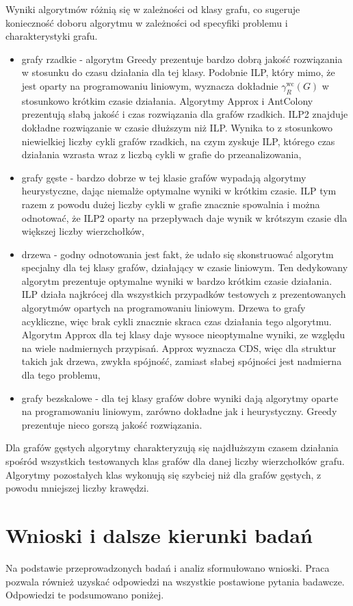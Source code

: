 Wyniki algorytmów różnią się w zależności od klasy grafu, co sugeruje konieczność doboru algorytmu w zależności od specyfiki problemu i charakterystyki grafu.
\begin{itemize}
    \item grafy rzadkie - algorytm Greedy prezentuje bardzo dobrą jakość rozwiązania w stosunku do czasu działania dla tej klasy. Podobnie ILP, który mimo, że jest oparty na programowaniu liniowym, wyznacza dokładnie $\gamma^{\text{wc}}_R(G)$ w stosunkowo krótkim czasie działania. Algorytmy Approx i AntColony prezentują słabą jakość i czas rozwiązania dla grafów rzadkich. ILP2 znajduje dokładne rozwiązanie w czasie dłuższym niż ILP. Wynika to z stosunkowo niewielkiej liczby cykli grafów rzadkich, na czym zyskuje ILP, którego czas działania wzrasta wraz z liczbą cykli w grafie do przeanalizowania,
    \item grafy gęste - bardzo dobrze w tej klasie grafów wypadają algorytmy heurystyczne, dając niemalże optymalne wyniki w krótkim czasie. ILP tym razem z powodu dużej liczby cykli w grafie znacznie spowalnia i można odnotować, że ILP2 oparty na przepływach daje wynik w krótszym czasie dla większej liczby wierzchołków,
    \item drzewa - godny odnotowania jest fakt, że udało się skonstruować algorytm specjalny dla tej klasy grafów, działający w czasie liniowym. Ten dedykowany algorytm prezentuje optymalne wyniki w bardzo krótkim czasie działania. ILP działa najkrócej dla wszystkich przypadków testowych z prezentowanych algorytmów opartych na programowaniu liniowym. Drzewa to grafy acykliczne, więc brak cykli znacznie skraca czas działania tego algorytmu. Algorytm Approx dla tej klasy daje wysoce nieoptymalne wyniki, ze względu na wiele nadmiernych przypisań. Approx wyznacza CDS, więc dla struktur takich jak drzewa, zwykła spójność, zamiast słabej spójności jest nadmierna dla tego problemu,
    \item grafy bezskalowe - dla tej klasy grafów dobre wyniki dają algorytmy oparte na programowaniu liniowym, zarówno dokładne jak i heurystyczny. Greedy prezentuje nieco gorszą jakość rozwiązania.
\end{itemize}
Dla grafów gęstych algorytmy charakteryzują się najdłuższym czasem działania spośród wszystkich testowanych klas grafów dla danej liczby wierzchołków grafu. Algorytmy pozostałych klas wykonują się szybciej niż dla grafów gęstych, z powodu mniejszej liczby krawędzi.

\section{Wnioski i dalsze kierunki badań}
Na podstawie przeprowadzonych badań i analiz sformułowano wnioski. Praca pozwala również uzyskać odpowiedzi na wszystkie postawione pytania badawcze. Odpowiedzi te podsumowano poniżej.

